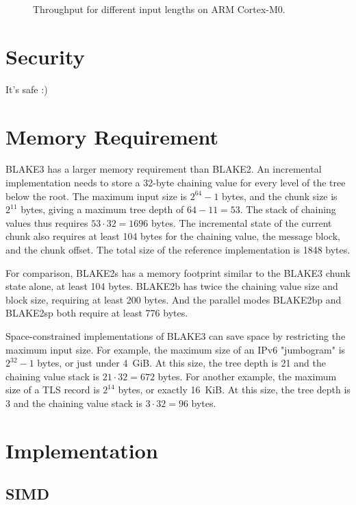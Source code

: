 \documentclass[11pt,notitlepage,a4paper]{article}
\begin{document}
\begin{figure}[h]

\caption{Throughput for different input lengths on ARM Cortex-M0.}
\label{fig:rpizero}
\end{figure}

\section{Security}\label{sec:security}

It's safe :)

\section{Memory Requirement}\label{sec:memory}

BLAKE3 has a larger memory requirement than BLAKE2. An incremental
implementation needs to store a 32-byte chaining value for every level of the
tree below the root. The maximum input size is $2^{64}-1$ bytes, and the chunk
size is $2^{11}$ bytes, giving a maximum tree depth of $64 - 11 = 53$. The
stack of chaining values thus requires $53 \cdot 32 = 1696$ bytes. The
incremental state of the current chunk also requires at least 104 bytes for the
chaining value, the message block, and the chunk offset. The total size of the
reference implementation is 1848 bytes.

For comparison, BLAKE2s has a memory footprint similar to the BLAKE3 chunk
state alone, at least 104 bytes. BLAKE2b has twice the chaining value size and
block size, requiring at least 200 bytes. And the parallel modes BLAKE2bp and
BLAKE2sp both require at least 776 bytes.

Space-constrained implementations of BLAKE3 can save space by restricting the
maximum input size. For example, the maximum size of an IPv6 "jumbogram" is
$2^{32}-1$ bytes, or just under 4~GiB. At this size, the tree depth is 21 and
the chaining value stack is $21 \cdot 32 = 672$ bytes. For another example, the
maximum size of a TLS record is $2^{14}$ bytes, or exactly 16~KiB. At this
size, the tree depth is 3 and the chaining value stack is $3 \cdot 32 = 96$
bytes.

\section{Implementation}\label{sec:implementation}

\subsection{SIMD}\label{sec:simd}
\end{document}
